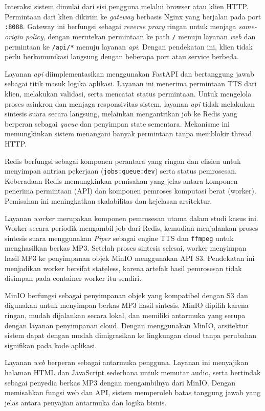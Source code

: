 Interaksi sistem dimulai dari sisi pengguna melalui browser atau klien HTTP.
Permintaan dari klien dikirim ke \textit{gateway} berbasis Nginx yang berjalan
pada port \texttt{:8088}. Gateway ini berfungsi sebagai \textit{reverse proxy}
ringan untuk menjaga \textit{same-origin policy}, dengan merutekan permintaan
ke path \texttt{/} menuju layanan \textit{web} dan permintaan ke
\texttt{/api/*} menuju layanan \textit{api}. Dengan pendekatan ini, klien tidak
perlu berkomunikasi langsung dengan beberapa port atau service berbeda.

Layanan \textit{api} diimplementasikan menggunakan FastAPI dan bertanggung
jawab sebagai titik masuk logika aplikasi. Layanan ini menerima permintaan TTS
dari klien, melakukan validasi, serta mencatat status permintaan. Untuk
mengelola proses asinkron dan menjaga responsivitas sistem, layanan
\textit{api} tidak melakukan sintesis suara secara langsung, melainkan
mengantrikan job ke Redis yang berperan sebagai \textit{queue} dan penyimpan
state sementara. Mekanisme ini memungkinkan sistem menangani banyak permintaan
tanpa memblokir thread HTTP.

Redis berfungsi sebagai komponen perantara yang ringan dan efisien untuk
menyimpan antrian pekerjaan (\texttt{jobs:queue:dev}) serta status pemrosesan.
Keberadaan Redis memungkinkan pemisahan yang jelas antara komponen penerima
permintaan (API) dan komponen pemroses komputasi berat (worker). Pemisahan ini
meningkatkan skalabilitas dan kejelasan arsitektur.

Layanan \textit{worker} merupakan komponen pemrosesan utama dalam studi kasus
ini. Worker secara periodik mengambil job dari Redis, kemudian menjalankan
proses sintesis suara menggunakan \textit{Piper} sebagai engine TTS dan
\texttt{ffmpeg} untuk menghasilkan berkas MP3. Setelah proses sintesis
selesai, worker menyimpan hasil MP3 ke penyimpanan objek MinIO menggunakan API
S3. Pendekatan ini menjadikan worker bersifat stateless, karena artefak hasil
pemrosesan tidak disimpan pada container worker itu sendiri.

MinIO berfungsi sebagai penyimpanan objek yang kompatibel dengan S3 dan
digunakan untuk menyimpan berkas MP3 hasil sintesis. MinIO dipilih karena
ringan, mudah dijalankan secara lokal, dan memiliki antarmuka yang serupa
dengan layanan penyimpanan cloud. Dengan menggunakan MinIO, arsitektur sistem
dapat dengan mudah dimigrasikan ke lingkungan cloud tanpa perubahan signifikan
pada kode aplikasi.

Layanan \textit{web} berperan sebagai antarmuka pengguna. Layanan ini menyajikan
halaman HTML dan JavaScript sederhana untuk memutar audio, serta bertindak
sebagai penyedia berkas MP3 dengan mengambilnya dari MinIO. Dengan memisahkan
fungsi web dan API, sistem memperoleh batas tanggung jawab yang jelas antara
penyajian antarmuka dan logika bisnis.


